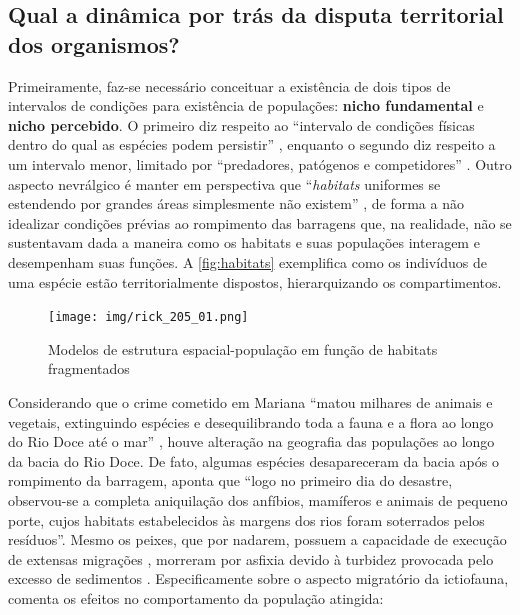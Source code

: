 \documentclass[
article,			%
11pt,				%
oneside,			%
a4paper,			%
english,			%
brazil,				%
sumario=tradicional
]{abntex2}
\begin{document}
	\subsection{Qual a dinâmica por trás da disputa territorial dos organismos?}
	
	Primeiramente, faz-se necessário conceituar a existência de dois tipos de intervalos de condições para existência de populações: \textbf{nicho fundamental} e \textbf{nicho percebido}. O primeiro diz respeito ao ``intervalo de condições físicas dentro do qual as espécies podem persistir'' \cite[p.177]{ricklefs2003a}, enquanto o segundo diz respeito a um intervalo menor, limitado por ``predadores, patógenos e competidores'' \cite[p.177]{ricklefs2003a}. Outro aspecto nevrálgico é manter em perspectiva que ``\textit{habitats} uniformes se estendendo por grandes áreas simplesmente não existem'' \cite[p.177]{ricklefs2003a}, de forma a não idealizar condições prévias ao rompimento das barragens que, na realidade, não se sustentavam dada a maneira como os habitats e suas populações interagem e desempenham suas funções. A \autoref{fig:habitats} exemplifica como os indivíduos de uma espécie estão territorialmente dispostos, hierarquizando os compartimentos.
	
	\begin{figure}
		\centering
		\caption{Modelos de estrutura espacial-população em função de habitats fragmentados}
		\texttt{[image: img/rick\_205\_01.png]}
		\label{fig:migracoes}
	\end{figure}
	
	Considerando que o crime cometido em Mariana ``matou milhares de animais e vegetais, extinguindo espécies e desequilibrando toda a fauna e a flora ao longo do Rio Doce até o mar'' \cite[p.282]{passos2017a}, houve alteração na geografia das populações ao longo da bacia do Rio Doce. De fato, algumas espécies desapareceram da bacia após o rompimento da barragem,  aponta que ``logo no primeiro dia do desastre, observou-se a completa aniquilação dos anfíbios, mamíferos e animais de pequeno porte, cujos habitats estabelecidos às margens dos rios foram soterrados pelos resíduos''. Mesmo os peixes, que por nadarem, possuem a capacidade de execução de extensas migrações \cite[p.181]{ricklefs2003a}, morreram por asfixia devido à turbidez provocada pelo excesso de sedimentos \cite[p.11]{lopes2016a}. Especificamente sobre o aspecto migratório da ictiofauna,  comenta os efeitos no comportamento da população atingida:
	
\end{document}
